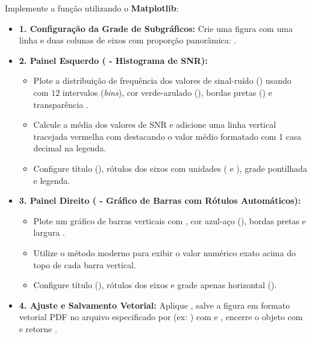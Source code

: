 \begin{enumerate}[label=\textbf{Q\arabic*.}]
Implemente a função  utilizando o \textbf{Matplotlib}:
\begin{itemize}[leftmargin=*]
    \item \textbf{1. Configuração da Grade de Subgráficos:}\newline
    Crie uma figura com uma linha e duas colunas de eixos com proporção panorâmica: .
    \item \textbf{2. Painel Esquerdo ( - Histograma de SNR):}\newline
    \begin{itemize}
        \item Plote a distribuição de frequência dos valores de sinal-ruído () usando  com $12$ intervalos (\emph{bins}), cor verde-azulado (), bordas pretas () e transparência .
        \item Calcule a média dos valores de SNR e adicione uma linha vertical tracejada vermelha com  destacando o valor médio formatado com 1 casa decimal na legenda.
        \item Configure título (), rótulos dos eixos com unidades ( e ), grade pontilhada e legenda.
    \end{itemize}
    \item \textbf{3. Painel Direito ( - Gráfico de Barras com Rótulos Automáticos):}\newline
    \begin{itemize}
        \item Plote um gráfico de barras verticais com , cor azul-aço (), bordas pretas e largura .
        \item Utilize o método moderno  para exibir o valor numérico exato acima do topo de cada barra vertical.
        \item Configure título (), rótulos dos eixos e grade apenas horizontal ().
    \end{itemize}
    \item \textbf{4. Ajuste e Salvamento Vetorial:}\newline
    Aplique , salve a figura em formato vetorial PDF no arquivo especificado por  (ex: ) com  e , encerre o objeto com  e retorne .
\end{itemize}


\end{enumerate}
